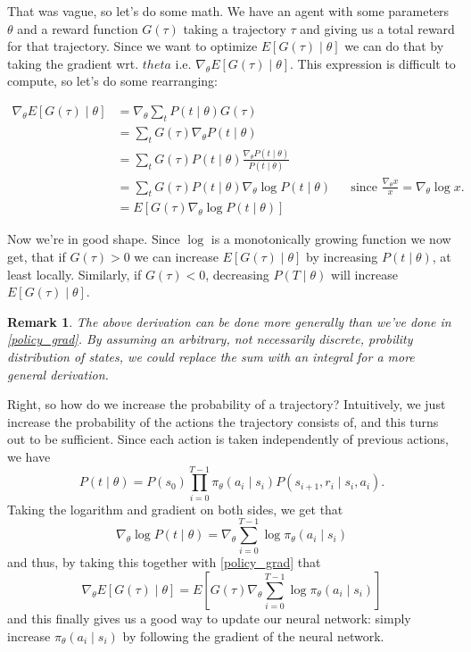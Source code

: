 \documentclass{article}
\theoremstyle{changedot}
\theoremstyle{changedotbreak}
\theoremstyle{nonumberplain}
\newtheorem{remark}{Remark}
\begin{document}
That was vague, so let's do some math. We have an agent with some parameters $\theta$ and a reward function $G(\tau)$ taking a trajectory $\tau$ and giving us a total reward for that trajectory. Since we want to optimize $E[G(\tau) \mid \theta]$ we can do that by taking the gradient wrt. $theta$ i.e. $\nabla_{\theta} E[G(\tau) \mid \theta]$. This expression is difficult to compute, so let's do some rearranging:

\begin{equation} \label{policy_grad}
\begin{aligned}
  \nabla_{\theta} E[G(\tau) \mid \theta] &= \nabla_{\theta} \sum_{t}P(t \mid \theta) G(\tau) \\
                                      &= \sum_{t} G(\tau) \nabla_{\theta} P(t \mid \theta)  \\
                                      &= \sum_{t} G(\tau) P(t \mid \theta) \frac{\nabla_{\theta} P(t \mid \theta)}{P(t \mid \theta)} \\
                                      &= \sum_{t} G(\tau) P(t \mid \theta) \nabla_{\theta} \log P(t \mid \theta) && \text{since $\frac{\nabla_{\theta} x}{x} = \nabla_{\theta} \log x$.} \\
                                      &= E[G(\tau) \nabla_{\theta} \log P(t \mid \theta)]
\end{aligned}
\end{equation}

Now we're in good shape. Since $\log$ is a monotonically growing function we now get, that if $G(\tau) > 0$ we can increase $E[G(\tau) \mid \theta]$ by increasing $P(t \mid \theta)$, at least locally. Similarly, if $G(\tau) < 0$, decreasing $P(T \mid \theta)$ will increase $E[G(\tau) \mid \theta]$.

\begin{remark}
  The above derivation can be done more generally than we've done in \ref{policy_grad}. By assuming an arbitrary, not necessarily discrete, probility distribution of states, we could replace the sum with an integral for a more general derivation.
\end{remark}

Right, so how do we increase the probability of a trajectory? Intuitively, we just increase the probability of the actions the trajectory consists of, and this turns out to be sufficient. Since each action is taken independently of previous actions, we have \[P(t \mid \theta) = P(s_{0}) \prod_{i=0}^{T-1} \pi_{\theta}(a_{i} \mid s_{i}) P(s_{i+1}, r_{i} \mid s_{i}, a_{i}).\] Taking the logarithm and gradient on both sides, we get that \[\nabla_{\theta} \log P(t \mid \theta) = \nabla_{\theta} \sum_{i=0}^{T-1} \log \pi_{\theta}(a_{i} \mid s_{i})\] and thus, by taking this together with \ref{policy_grad} that \[\nabla_{\theta} E[G(\tau) \mid \theta] = E\left[ G(\tau) \nabla_{\theta} \sum_{i=0}^{T-1} \log \pi_{\theta} (a_{i} \mid s_{i}) \right]\] and this finally gives us a good way to update our neural network: simply increase $\pi_{\theta} (a_{i} \mid s_{i})$ by following the gradient of the neural network.
\end{document}
